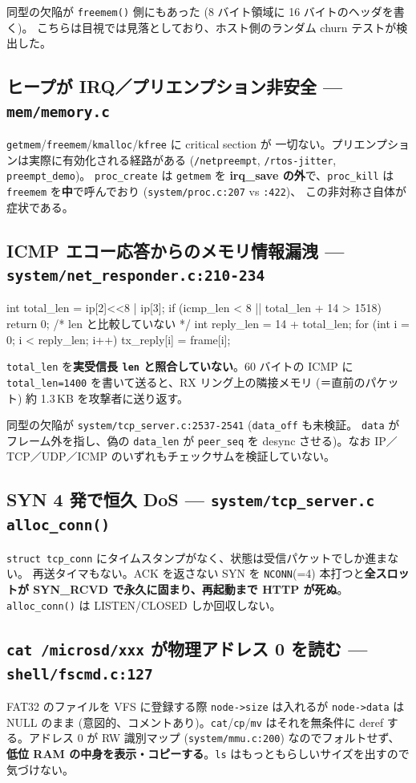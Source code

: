\documentclass[a4paper,11pt]{ltjsarticle}
\newcommand{\finding}[2]{\subsection{#1 --- \texttt{#2}}}
\begin{document}
同型の欠陥が \texttt{freemem()} 側にもあった (8 バイト領域に 16 バイトのヘッダを書く)。
こちらは目視では見落としており、ホスト側のランダム churn テストが検出した。

\finding{ヒープが IRQ／プリエンプション非安全}{mem/memory.c}

\texttt{getmem}/\texttt{freemem}/\texttt{kmalloc}/\texttt{kfree} に critical section が
一切ない。プリエンプションは実際に有効化される経路がある
(\texttt{/netpreempt}, \texttt{/rtos-jitter}, \texttt{preempt\_demo})。
\texttt{proc\_create} は \texttt{getmem} を\textbf{ irq\_save の外}で、\texttt{proc\_kill}
は \texttt{freemem} を\textbf{中}で呼んでおり (\texttt{system/proc.c:207} vs \texttt{:422})、
この非対称さ自体が症状である。

\finding{ICMP エコー応答からのメモリ情報漏洩}{system/net\_responder.c:210-234}

\begin{code}
int total_len = ip[2]<<8 | ip[3];
if (icmp_len < 8 || total_len + 14 > 1518) return 0;   /* len と比較していない */
int reply_len = 14 + total_len;
for (int i = 0; i < reply_len; i++) tx_reply[i] = frame[i];
\end{code}

\texttt{total\_len} を\textbf{実受信長 \texttt{len} と照合していない}。60 バイトの ICMP に
\texttt{total\_len=1400} を書いて送ると、RX リング上の隣接メモリ (＝直前のパケット) 約
1.3\,KB を攻撃者に送り返す。

同型の欠陥が \texttt{system/tcp\_server.c:2537-2541} (\texttt{data\_off} も未検証。
\texttt{data} がフレーム外を指し、偽の \texttt{data\_len} が \texttt{peer\_seq} を
desync させる)。なお IP／TCP／UDP／ICMP のいずれもチェックサムを検証していない。

\finding{SYN 4 発で恒久 DoS}{system/tcp\_server.c alloc\_conn()}

\texttt{struct tcp\_conn} にタイムスタンプがなく、状態は受信パケットでしか進まない。
再送タイマもない。ACK を返さない SYN を \texttt{NCONN}(=4) 本打つと\textbf{全スロットが
SYN\_RCVD で永久に固まり、再起動まで HTTP が死ぬ}。\texttt{alloc\_conn()} は
LISTEN/CLOSED しか回収しない。

\finding{\texttt{cat /microsd/xxx} が物理アドレス 0 を読む}{shell/fscmd.c:127}

FAT32 のファイルを VFS に登録する際 \texttt{node->size} は入れるが \texttt{node->data} は
NULL のまま (意図的、コメントあり)。\texttt{cat}/\texttt{cp}/\texttt{mv} はそれを無条件に
deref する。アドレス 0 が RW 識別マップ (\texttt{system/mmu.c:200}) なのでフォルトせず、
\textbf{低位 RAM の中身を表示・コピーする}。\texttt{ls} はもっともらしいサイズを出すので
気づけない。
\end{document}
